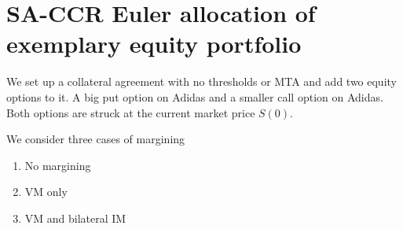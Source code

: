     

    
    \hypertarget{sa-ccr-euler-allocation-of-exemplary-equity-portfolio}{%
\section{SA-CCR Euler allocation of exemplary equity
portfolio}\label{sa-ccr-euler-allocation-of-exemplary-equity-portfolio}}

We set up a collateral agreement with no thresholds or MTA and add two
equity options to it. A big put option on Adidas and a smaller call
option on Adidas. Both options are struck at the current market price
\(S(0)\).

We consider three cases of margining

\begin{enumerate}
\def\labelenumi{\arabic{enumi}.}
\tightlist
\item
  No margining
\item
  VM only
\item
  VM and bilateral IM
\end{enumerate}

